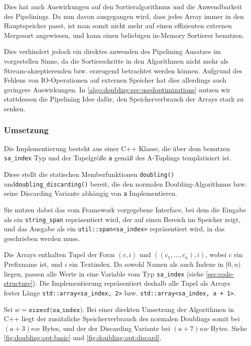 Dies hat auch Auswirkungen auf den Sortieralgorithmus und die Anwendbarkeit des Pipelinings. Da nun davon ausgegangen wird, dass jedes Array immer in den Hauptspeicher passt, ist man somit nicht mehr auf einen effizienten externen Mergesort angewiesen, und kann einen beliebigen in-Memory Sortierer benutzen. 

Dies verhindert jedoch ein direktes anwenden des Pipelining Ansatzes im vorgestellen Sinne, da die Sortierschritte in den Algorithmen nicht mehr als Stream-akzeptierenden bzw. erzeugend betrachtet werden können. Aufgrund des Fehlens von IO-Operationen auf externen Speicher hat dies allerdings auch geringere Auswirkungen. In \cref{algo:doubling:sec:usedoptimizations} nutzen wir stattdessen die Pipelining Idee dafür, den Speicherverbrauch der Arrays stark zu senken.

\subsubsection{Umsetzung}

Die Implementierung besteht aus einer C++ Klasse, die über dem benutzen \texttt{sa\_index} Typ und der Tupelgröße \texttt{a} gemäß des A-Tuplings templatisiert ist.

Diese stellt die statischen Memberfunktionen \texttt{doubling()} und\linebreak \texttt{doubling\_discarding()} bereit, die den normalen Doubling-Algorithmus bzw. seine Discarding Variante abhängig von \texttt{a} Implementieren.

Sie nutzen dabei das vom Framework vorgegebene Interface, bei dem die Eingabe als ein \texttt{string\_span} repräsentiert wird, der auf einen Bereich im Speicher zeigt, und das Ausgabe \sa als ein \texttt{util::span<sa\_index>} repräsentiert wird, in das geschrieben werden muss.

Die Arrays enthalten Tupel der Form  $(c, i)$ und $((c_1, \dots, c_a), i)$, wobei $c$ ein Prefixname ist, und $i$ ein Textindex. Da sowohl Namen als auch Indexe in $[0, n)$ liegen, passen alle Werte in eine Variable vom Typ \texttt{sa\_index} (siehe \cref{sec:code-structure}). Die Implementierung repräsentiert deshalb alle Tupel als Arrays fester Länge \texttt{std::array<sa\_index, 2>} bzw. \texttt{std::array<sa\_index, a + 1>}.

Sei $w = \texttt{sizeof(sa\_index)}$. Bei einer direkten Umsetzung der Algorithmen in C++ liegt der zusätzliche Speicherverbrauch des normalen Doublings somit bei $(a + 3)nw$ Bytes, und der der Discarding Variante bei $(a + 7)nw$ Bytes. Siehe \cref{fig:doubling:opt:basic} und \cref{fig:doubling:opt:discard}.

